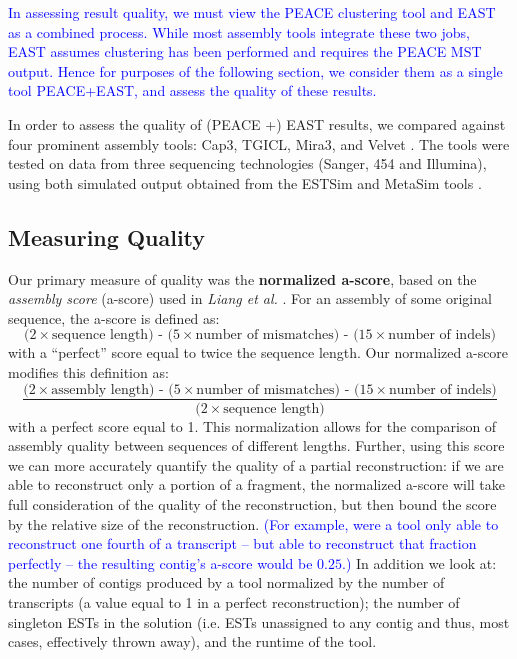 \documentclass[10pt]{bmc_article}
\newcommand{\peace} {{\small PEACE}}
\newcommand{\capthree} {{\small Cap3}}
\newcommand{\estsim}{{\small ESTSim}}
\newcommand{\metasim} {{\small MetaSim}}
\newcommand{\tgicl} {{\small TGICL}}
\newcommand{\east} {{\small EAST}}
\newcommand{\velvet}{{\small Velvet}}
\newcommand{\mira}{{\small Mira3}}
\newcommand{\peast}{{\small PEACE+EAST}}
\newenvironment{bmcformat}{\begin{raggedright}\baselineskip20pt\sloppy\setboolean{publ}{false}}{\end{raggedright}\baselineskip20pt\sloppy}
\begin{document}
\begin{bmcformat}
\textcolor{blue}{In assessing result quality, we must view the \peace\/ clustering tool
\cite{Rao10} and \east\/ as a combined process.  While most assembly
tools integrate these two jobs, \east\/ assumes clustering has been
performed and requires the \peace\/ MST output.  Hence for purposes of
the following section, we consider them as a single tool \peast, and
assess the quality of these results.}

\vspace{3mm}

In order to assess the quality of (\peace\/ +) \east\/ results, we compared
against four prominent assembly tools: \capthree, \tgicl,
\mira, and \velvet\/ \cite{Huang99,Pertea03,Chevreux04,Zerbino08}.  The tools were tested on data from three
sequencing technologies (Sanger, 454 and Illumina), using both
simulated output obtained from the \estsim\/ and \metasim\/ tools
\cite{Hazelhurst03,Richter08}.  


\subsection*{Measuring Quality}
Our primary measure of quality was the {\bf normalized a-score}, based
on the {\it assembly score} (a-score) used in {\it Liang et al.}
\cite{Liang00}.  For an assembly of some original sequence, the
a-score is defined as:
$$\mbox{($2\times$sequence length) - ($5\times$number of
mismatches) - ($15 \times$number of indels)}$$
with a ``perfect'' score equal to twice the sequence length.  Our
normalized a-score modifies this definition as:
$$\frac{\mbox{($2\times$assembly length) - ($5\times$number of mismatches)
    - ($15\times$number of indels)}}{\mbox{($2\times$sequence
    length)}}$$ with a perfect score equal to 1.  This normalization
allows for the comparison of assembly quality between sequences of
different lengths. Further, using this score we can more accurately
quantify the quality of a partial reconstruction: if we are able to
reconstruct only a portion of a fragment, the normalized a-score will
take full consideration of the quality of the reconstruction, but then
bound the score by the relative size of the reconstruction.
\textcolor{blue}{(For example, were a tool only able to reconstruct
  one fourth of a transcript -- but able to reconstruct that fraction
  perfectly -- the resulting contig's a-score would be $0.25$.)}  In
addition we look at: the number of contigs produced by a tool
normalized by the number of transcripts (a value equal to 1 in a
perfect reconstruction); the number of singleton ESTs in the solution
(i.e. ESTs unassigned to any contig and thus, most cases, effectively
thrown away), and the runtime of the tool.


\end{bmcformat}
\end{document}
